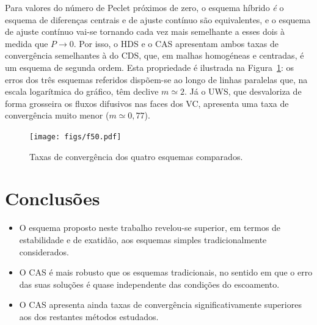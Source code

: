 \documentclass[11pt,twoside]{article}
\begin{document}
{Para valores do número de Peclet próximos de zero, o esquema híbrido \emph{é} o esquema de diferenças centrais e de ajuste contínuo são equivalentes, e o esquema de ajuste contínuo vai-se tornando cada vez mais semelhante a esses dois à medida que $P\rightarrow0$. Por isso, o HDS e o CAS apresentam ambos taxas de convergência semelhantes à do CDS, que, em malhas homogéneas e centradas, é um esquema de segunda ordem.  Esta propriedade é ilustrada na Figura~\ref{fig:50}: os erros dos três esquemas referidos dispõem-se ao longo de linhas paralelas que, na escala logarítmica do gráfico, têm declive $m\simeq2$. Já o UWS, que desvaloriza de forma grosseira os fluxos difusivos nas faces dos VC, apresenta uma taxa de convergência muito menor ($m\simeq0,77$).
\begin{figure}[!h]
\centering
\texttt{[image: figs/f50.pdf]}
\caption{Taxas de convergência dos quatro esquemas comparados. \label{fig:50}}
\end{figure}

%











\section{Conclusões}

\begin{itemize}

\item O esquema proposto neste trabalho revelou-se superior, em termos de
    estabilidade e de exatidão, aos esquemas simples tradicionalmente
    considerados.
\item O CAS é mais robusto que os esquemas tradicionais, no sentido em que o
    erro das suas soluções é quase independente das condições do escoamento.
\item O CAS apresenta ainda taxas de convergência significativamente superiores
    aos dos restantes métodos estudados.



\end{itemize}}
\end{document}
